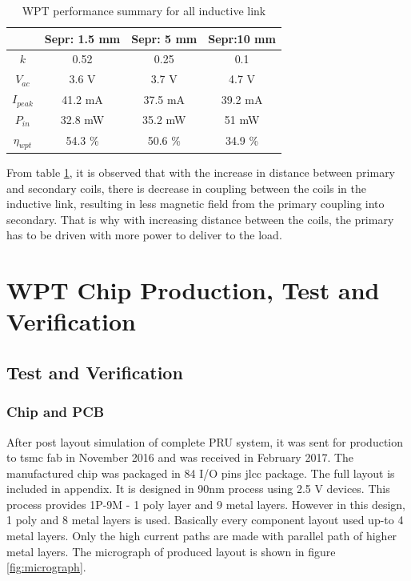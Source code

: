 \documentclass[12pt,a4paper,UKenglish]{report}
\begin{document}
\begin{table}[H]
\caption{WPT performance summary for all inductive link} 
\begin{center}
\begin{tabular}{c|c|c|c}
\hline \hline
				& \textbf{Sepr: 1.5 mm}	& \textbf{Sepr: 5 mm} 	& \textbf{Sepr:10 mm} \\ \hline \hline
$ k $				& 0.52						& 0.25		& 0.1		\\ \hline
$V_{ac}$			& 3.6 \si{\volt}		& 3.7 \si{\volt} 		& 4.7 \si{\volt}	\\ \hline
$I_{peak}$			& 41.2 \si{\milli\ampere}	& 37.5 \si{\milli\ampere} 	& 39.2 \si{\milli\ampere} \\ \hline
$P_{in}$			& 32.8 \si{\milli\watt}	& 35.2 \si{\milli\watt} 	& 51 \si{\milli\watt} \\ \hline
$\eta_{wpt}$			& 54.3 \%		& 50.6 \%			& 34.9 \% \\ 
 
\hline \hline
\end{tabular}
\end{center}
\label{tab:wpt_spec_all}
\end{table}%

From table \ref{tab:wpt_spec_all}, it is observed that with the increase in distance between primary and secondary coils, there is decrease in coupling 
between the coils in the inductive link, resulting in less magnetic field from the primary coupling into secondary. That is why with increasing 
distance between the coils, the primary has to be driven with more power to deliver to the load.

\part{WPT Chip Production, Test and Verification } 
\chapter{Test and Verification }  %

\section{Chip and PCB}
After post layout simulation of complete PRU system, it was sent for production to \acrshort{tsmc} fab in November 2016 and was received in February 2017. The  manufactured chip was packaged in 84 I/O pins \acrshort{jlcc} package. The full layout is included in appendix. It is designed in 90nm process using 2.5 V devices. This process provides 1P-9M - 1 poly layer and 9 metal layers. However in this design, 1 poly and 8 metal layers is used. Basically every component layout used up-to 4 metal layers. Only the high current paths are made with parallel path of higher metal layers. The micrograph of produced layout is shown in figure \ref{fig:micrograph}.\\
\end{document}
